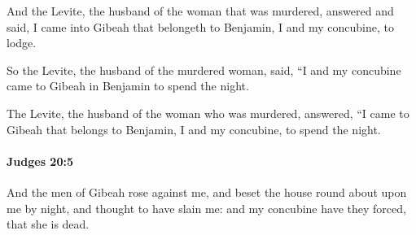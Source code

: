 			\begin{versebox}
					\item[BHS] 
					\item[ASV] And the Levite, the husband of the woman that was murdered, answered and said, I came into Gibeah that belongeth to Benjamin, I and my concubine, to lodge.
					\item[NIV] So the Levite, the husband of the murdered woman, said, “I and my concubine came to Gibeah in Benjamin to spend the night.
					\item[NRSV] The Levite, the husband of the woman who was murdered, answered, “I came to Gibeah that belongs to Benjamin, I and my concubine, to spend the night.
			\end{versebox}

		\paragraph{Judges 20:5} %
			\label{JUDGES-20-5}

			And the men of Gibeah rose against me, and beset the house round about upon me by night, and thought to have slain me: and my concubine have they forced, that she is dead.

